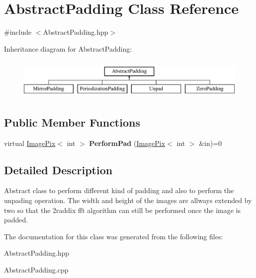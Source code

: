 \hypertarget{class_abstract_padding}{}\section{Abstract\+Padding Class Reference}
\label{class_abstract_padding}


{\ttfamily \#include $<$Abstract\+Padding.\+hpp$>$}

Inheritance diagram for Abstract\+Padding\+:\begin{figure}[H]
\begin{center}
\leavevmode
\includegraphics[height=2.000000cm]{class_abstract_padding}
\end{center}
\end{figure}
\subsection*{Public Member Functions}
\begin{DoxyCompactItemize}
\item 
\mbox{\label{class_abstract_padding_a1718652cce1bfac03d7e3918b5d380bd}} 
virtual \hyperlink{class_image_pix}{Image\+Pix}$<$ int $>$ {\bfseries Perform\+Pad} (\hyperlink{class_image_pix}{Image\+Pix}$<$ int $>$ \&in)=0
\end{DoxyCompactItemize}


\subsection{Detailed Description}
Abstract class to perform different kind of padding and also to perform the unpading operation. The width and height of the images are allways extended by two so that the 2raddix fft algorithm can still be performed once the image is padded. 

The documentation for this class was generated from the following files\+:\begin{DoxyCompactItemize}
\item 
Abstract\+Padding.\+hpp\item 
Abstract\+Padding.\+cpp\end{DoxyCompactItemize}
